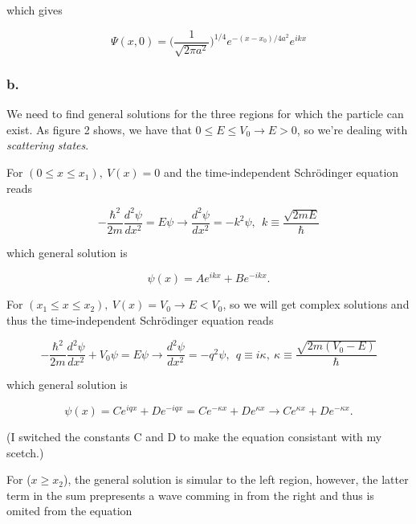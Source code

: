 \documentclass{article}
\begin{document}
which gives 

\begin{equation}
\Psi(x, 0) = \bigg(\frac{1}{\sqrt{2\pi a^2}}\bigg)^{1/4}e^{-(x-x_0)/4a^2}e^{ikx}
\end{equation}



\subsubsection*{b.}

We need to find general solutions for the three regions for which the particle can exist. As figure 2 shows, we have that $0 \leq E \leq V_0 \rightarrow E > 0$, so we're dealing with \textit{scattering states}.

\bigskip

For $(0 \leq x \leq x_1), \ V(x) = 0$ and the time-independent Schrödinger equation reads

\begin{equation}
-\frac{\hbar^2}{2m}\frac{d^2\psi}{dx^2} = E\psi \rightarrow \frac{d^2\psi}{dx^2} = -k^2\psi, \ \ k \equiv \frac{\sqrt{2mE}}{\hbar}
\end{equation}

which general solution is

\begin{equation}
\psi(x) = Ae^{ikx} + Be^{-ikx}.
\end{equation}

For $(x_1 \leq x \leq x_2), \ V(x) = V_0 \rightarrow E < V_0$, so we will get complex solutions and thus the time-independent Schrödinger equation reads

\begin{equation}
-\frac{\hbar^2}{2m}\frac{d^2\psi}{dx^2} + V_0\psi = E\psi \rightarrow \frac{d^2\psi}{dx^2} = -q^2\psi, \ \ q \equiv i\kappa, \ \kappa \equiv \frac{\sqrt{2m(V_0 - E)}}{\hbar}
\end{equation}

which general solution is

\begin{equation}
\psi(x) = Ce^{iqx} + De^{-iqx} = Ce^{-\kappa x} + De^{\kappa x} \rightarrow Ce^{\kappa x} + De^{-\kappa x}.
\end{equation}

(I switched the constants C and D to make the equation consistant with my scetch.)

For ($x \geq x_2$), the general solution is simular to the left region, however, the latter term in the sum prepresents a wave comming in from the right and thus is omited from the equation
\end{document}
